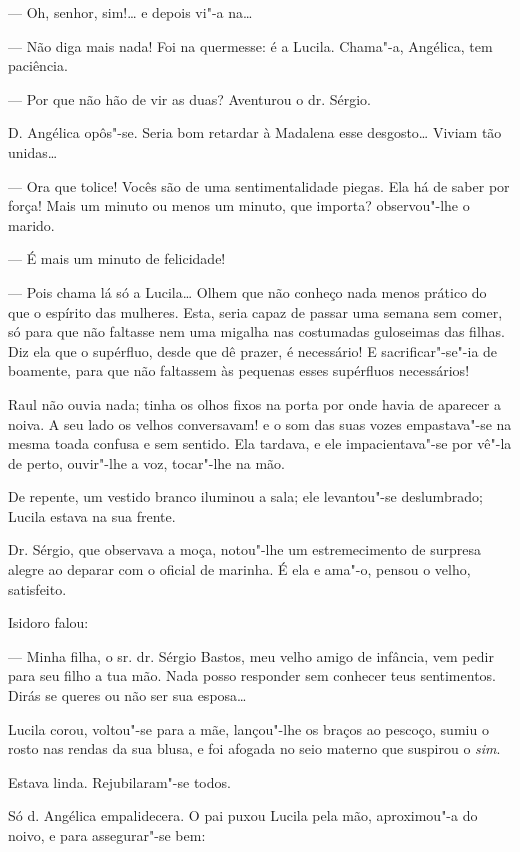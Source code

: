 --- Oh, senhor, sim!\ldots{} e depois vi"-a na\ldots{}

--- Não diga mais nada! Foi na quermesse: é a Lucila. Chama"-a, Angélica,
tem paciência.

--- Por que não hão de vir as duas? Aventurou o dr. Sérgio.

D. Angélica opôs"-se. Seria bom retardar à Madalena esse desgosto\ldots{}
Viviam tão unidas\ldots{}

--- Ora que tolice! Vocês são de uma sentimentalidade piegas. Ela há de
saber por força! Mais um minuto ou menos um minuto, que importa?
observou"-lhe o marido.

--- É mais um minuto de felicidade!

--- Pois chama lá só a Lucila\ldots{} Olhem que não conheço nada menos
prático do que o espírito das mulheres. Esta, seria capaz de passar uma
semana sem comer, só para que não faltasse nem uma migalha nas
costumadas guloseimas das filhas. Diz ela que o supérfluo, desde que dê
prazer, é necessário! E sacrificar"-se"-ia de boamente, para que não
faltassem às pequenas esses supérfluos necessários!

Raul não ouvia nada; tinha os olhos fixos na porta por onde havia de
aparecer a noiva. A seu lado os velhos conversavam! e o som das suas
vozes empastava"-se na mesma toada confusa e sem sentido. Ela tardava, e
ele impacientava"-se por vê"-la de perto, ouvir"-lhe a voz, tocar"-lhe na
mão.

De repente, um vestido branco iluminou a sala; ele levantou"-se
deslumbrado; Lucila estava na sua frente.

Dr. Sérgio, que observava a moça, notou"-lhe um estremecimento de
surpresa alegre ao deparar com o oficial de marinha. É ela e ama"-o,
pensou o velho, satisfeito.

Isidoro falou:

--- Minha filha, o sr. dr. Sérgio Bastos, meu velho amigo de infância,
vem pedir para seu filho a tua mão. Nada posso responder sem conhecer
teus sentimentos. Dirás se queres ou não ser sua esposa\ldots{}

Lucila corou, voltou"-se para a mãe, lançou"-lhe os braços ao pescoço,
sumiu o rosto nas rendas da sua blusa, e foi afogada no seio materno que
suspirou o \emph{sim}.

Estava linda. Rejubilaram"-se todos.

Só d. Angélica empalidecera. O pai puxou Lucila pela mão, aproximou"-a do
noivo, e para assegurar"-se bem:

